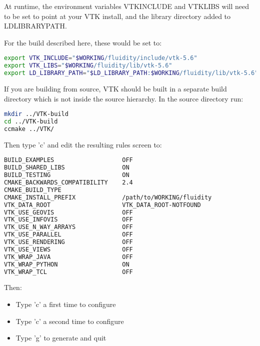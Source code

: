 At runtime, the environment variables VTK{\textunderscore}INCLUDE and
VTK{\textunderscore}LIBS will need to be set to point at your VTK install, and
the library directory added to LD{\textunderscore}LIBRARY{\textunderscore}PATH.

For the build described here, these would be set to:

\begin{lstlisting}[language=bash]
export VTK_INCLUDE="$WORKING/fluidity/include/vtk-5.6"
export VTK_LIBS="$WORKING/fluidity/lib/vtk-5.6"
export LD_LIBRARY_PATH="$LD_LIBRARY_PATH:$WORKING/fluidity/lib/vtk-5.6"
\end{lstlisting}

If you are building from source, VTK should be built in a separate build
directory which is not inside the source hierarchy. In the source directory
run:

\begin{lstlisting}[language=bash]
mkdir ../VTK-build
cd ../VTK-build
ccmake ../VTK/
\end{lstlisting}

Then type 'c' and edit the resulting rules screen to:

\begin{lstlisting}[language=bash]
BUILD_EXAMPLES                   OFF
BUILD_SHARED_LIBS                ON                                     
BUILD_TESTING                    ON
CMAKE_BACKWARDS_COMPATIBILITY    2.4
CMAKE_BUILD_TYPE
CMAKE_INSTALL_PREFIX             /path/to/WORKING/fluidity          
VTK_DATA_ROOT                    VTK_DATA_ROOT-NOTFOUND
VTK_USE_GEOVIS                   OFF                                    
VTK_USE_INFOVIS                  OFF                                    
VTK_USE_N_WAY_ARRAYS             OFF
VTK_USE_PARALLEL                 OFF
VTK_USE_RENDERING                OFF                                    
VTK_USE_VIEWS                    OFF                                    
VTK_WRAP_JAVA                    OFF
VTK_WRAP_PYTHON                  ON                                     
VTK_WRAP_TCL                     OFF
\end{lstlisting}

Then:

\begin{itemize}
  \item Type 'c' a first time to configure
  \item Type 'c' a second time to configure
  \item Type 'g' to generate and quit
\end{itemize}

